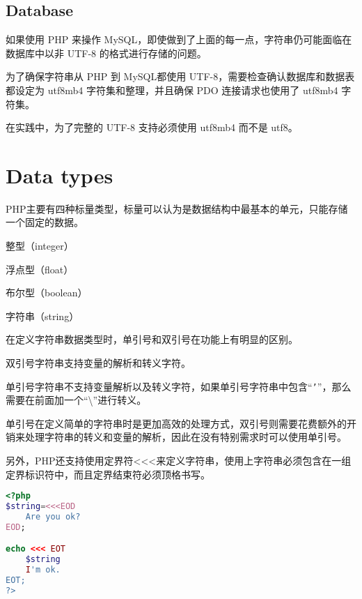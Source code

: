 \section{Database}

如果使用 PHP 来操作 MySQL，即使做到了上面的每一点，字符串仍可能面临在数据库中以非 UTF-8 的格式进行存储的问题。

为了确保字符串从 PHP 到 MySQL都使用 UTF-8，需要检查确认数据库和数据表都设定为 utf8mb4 字符集和整理，并且确保 PDO 连接请求也使用了 utf8mb4 字符集。




在实践中，为了完整的 UTF-8 支持必须使用 utf8mb4 而不是 utf8。

\chapter{Data types}

PHP主要有四种标量类型，标量可以认为是数据结构中最基本的单元，只能存储一个固定的数据。

\begin{compactitem}
\item 整型（integer）
\item 浮点型（float）
\item 布尔型（boolean）
\item 字符串（string）
\end{compactitem}

在定义字符串数据类型时，单引号和双引号在功能上有明显的区别。

\begin{compactitem}
\item 双引号字符串支持变量的解析和转义字符。
\item 单引号字符串不支持变量解析以及转义字符，如果单引号字符串中包含“\texttt{'}”，那么需要在前面加一个“\textbackslash ”进行转义。
\end{compactitem}

单引号在定义简单的字符串时是更加高效的处理方式，双引号则需要花费额外的开销来处理字符串的转义和变量的解析，因此在没有特别需求时可以使用单引号。

另外，PHP还支持使用定界符<\/<\/<来定义字符串，使用上字符串必须包含在一组定界标识符中，而且定界结束符必须顶格书写。

\begin{lstlisting}[language=PHP]
<?php
$string=<<<EOD
	Are you ok?
EOD;

echo <<< EOT
	$string
	I'm ok.
EOT;
?>
\end{lstlisting}

